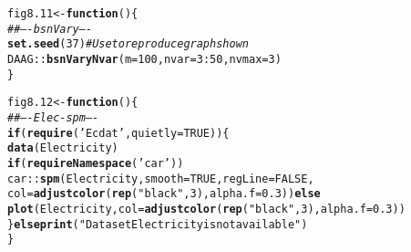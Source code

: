 \documentclass[12pt, a4paper,  BCOR=8.25mm, DIV=15]{scrartcl}\usepackage[]{graphicx}\usepackage[]{color}
\makeatletter
\newcommand{\hlnum}[1]{\textcolor[rgb]{0.686,0.059,0.569}{#1}}%
\newcommand{\hlstr}[1]{\textcolor[rgb]{0.192,0.494,0.8}{#1}}%
\newcommand{\hlcom}[1]{\textcolor[rgb]{0.678,0.584,0.686}{\textit{#1}}}%
\newcommand{\hlopt}[1]{\textcolor[rgb]{0,0,0}{#1}}%
\newcommand{\hlstd}[1]{\textcolor[rgb]{0.345,0.345,0.345}{#1}}%
\newcommand{\hlkwa}[1]{\textcolor[rgb]{0.161,0.373,0.58}{\textbf{#1}}}%
\newcommand{\hlkwb}[1]{\textcolor[rgb]{0.69,0.353,0.396}{#1}}%
\newcommand{\hlkwc}[1]{\textcolor[rgb]{0.333,0.667,0.333}{#1}}%
\newcommand{\hlkwd}[1]{\textcolor[rgb]{0.737,0.353,0.396}{\textbf{#1}}}%
\newenvironment{kframe}{%
 \def\at@end@of@kframe{}%
 \ifinner\ifhmode%
  \def\at@end@of@kframe{\end{minipage}}%
  \begin{minipage}{\columnwidth}%
 \fi\fi%
 \def\FrameCommand##1{\hskip\@totalleftmargin \hskip-\fboxsep
 \colorbox{shadecolor}{##1}\hskip-\fboxsep
     \hskip-\linewidth \hskip-\@totalleftmargin \hskip\columnwidth}%
 \MakeFramed {\advance\hsize-\width
   \@totalleftmargin\z@ \linewidth\hsize
   \@setminipage}}%
 {\par\unskip\endMakeFramed%
 \at@end@of@kframe}
\newenvironment{knitrout}{}{} %
\makeatother
\begin{document}
\begin{knitrout}
\color{fgcolor}\begin{kframe}
\begin{alltt}
\hlstd{fig8.11} \hlkwb{<-} \hlkwa{function}\hlstd{()\{}
\hlcom{## ---- bsnVary ----}
\hlkwd{set.seed}\hlstd{(}\hlnum{37}\hlstd{)}   \hlcom{# Use to reproduce graph shown}
\hlstd{DAAG}\hlopt{::}\hlkwd{bsnVaryNvar}\hlstd{(}\hlkwc{m}\hlstd{=}\hlnum{100}\hlstd{,} \hlkwc{nvar}\hlstd{=}\hlnum{3}\hlopt{:}\hlnum{50}\hlstd{,} \hlkwc{nvmax}\hlstd{=}\hlnum{3}\hlstd{)}
\hlstd{\}}
\end{alltt}
\end{kframe}
\end{knitrout}

\begin{knitrout}
\color{fgcolor}\begin{kframe}
\begin{alltt}
\hlstd{fig8.12} \hlkwb{<-} \hlkwa{function}\hlstd{()\{}
\hlcom{## ---- Elec-spm ----}
\hlkwa{if}\hlstd{(}\hlkwd{require}\hlstd{(}\hlstr{'Ecdat'}\hlstd{,} \hlkwc{quietly}\hlstd{=}\hlnum{TRUE}\hlstd{))\{}
  \hlkwd{data}\hlstd{(Electricity)}
  \hlkwa{if}\hlstd{(}\hlkwd{requireNamespace}\hlstd{(}\hlstr{'car'}\hlstd{))}
  \hlstd{car}\hlopt{::}\hlkwd{spm}\hlstd{(Electricity,} \hlkwc{smooth}\hlstd{=}\hlnum{TRUE}\hlstd{,} \hlkwc{regLine}\hlstd{=}\hlnum{FALSE}\hlstd{,}
           \hlkwc{col}\hlstd{=}\hlkwd{adjustcolor}\hlstd{(}\hlkwd{rep}\hlstd{(}\hlstr{"black"}\hlstd{,}\hlnum{3}\hlstd{),} \hlkwc{alpha.f}\hlstd{=}\hlnum{0.3}\hlstd{))} \hlkwa{else}
      \hlkwd{plot}\hlstd{(Electricity,} \hlkwc{col}\hlstd{=}\hlkwd{adjustcolor}\hlstd{(}\hlkwd{rep}\hlstd{(}\hlstr{"black"}\hlstd{,}\hlnum{3}\hlstd{),} \hlkwc{alpha.f}\hlstd{=}\hlnum{0.3}\hlstd{))}
\hlstd{\}} \hlkwa{else} \hlkwd{print}\hlstd{(}\hlstr{"Dataset Electricity is not available"}\hlstd{)}
\hlstd{\}}
\end{alltt}
\end{kframe}
\end{knitrout}
\end{document}

